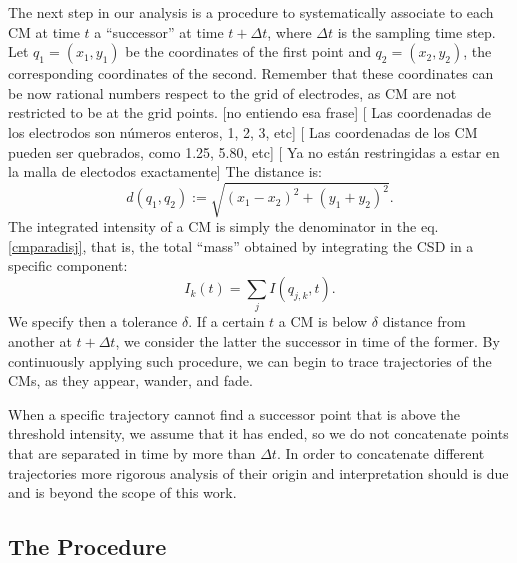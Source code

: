 \documentclass[letterpaper,12pts]{article}
\newcommand{\komment}[1]{{\color{red} [#1]}}
\newcommand{\romment}[1]{{\color{blue} [#1]}}
\begin{document}
The next step in our analysis is a procedure to systematically associate to each CM
at time $t$ a ``successor'' at time $t+\Delta t$, where $\Delta t$ is the sampling
time step. Let $q_1=(x_1, y_1)$ be the coordinates of the first point and $q_2=(x_2,y_2)$,
the corresponding coordinates of the second.
Remember that these coordinates can be now
rational numbers
respect to the grid of electrodes,
as CM are not restricted to be at the grid points.
\romment{no entiendo esa frase}
\komment{ Las coordenadas de los electrodos son números enteros, 1, 2, 3, etc}
\komment{ Las coordenadas de los CM pueden ser quebrados, como 1.25, 5.80, etc}
\komment{ Ya no están restringidas a estar en la malla de electodos exactamente}
The distance is:
\begin{equation}
d(q_1,q_2):=\sqrt{(x_1-x_2)^2+(y_1+y_2)^2}.
\end{equation}
The integrated intensity of a CM is simply the denominator in the
eq. \ref{cmparadisj},
that is, the total ``mass'' obtained by integrating the CSD in a specific component:
\begin{equation}
  I_k(t)=\sum_j I (q_{j,k}, t).
\end{equation}
We specify then a tolerance $\delta$. If a certain $t$ a CM is below $\delta$ distance from another at $t+\Delta t$, we consider the latter the successor in time of the former. By continuously applying such procedure, we can begin to trace trajectories of the CMs, as they appear, wander, and fade. 

When a specific trajectory cannot find a successor point that is above the
threshold intensity, we assume that it has ended, so we do not concatenate
points that are separated in time by more than $\Delta t$.
In order to concatenate different
trajectories more rigorous analysis of their origin and interpretation
should is due and is beyond the scope of this work.



 \subsection{The Procedure}
 
\end{document}
